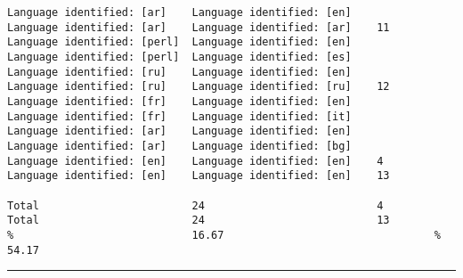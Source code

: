 \begin{verbatim}
Language identified: [ar]    Language identified: [en]             Language identified: [ar]    Language identified: [ar]    11
Language identified: [perl]  Language identified: [en]             Language identified: [perl]  Language identified: [es]
Language identified: [ru]    Language identified: [en]             Language identified: [ru]    Language identified: [ru]    12
Language identified: [fr]    Language identified: [en]             Language identified: [fr]    Language identified: [it]
Language identified: [ar]    Language identified: [en]             Language identified: [ar]    Language identified: [bg]
Language identified: [en]    Language identified: [en]    4        Language identified: [en]    Language identified: [en]    13

Total                        24                           4        Total                        24                           13
%                            16.67                                 %                            54.17
\end{verbatim}
\vskip4pt\hrule


